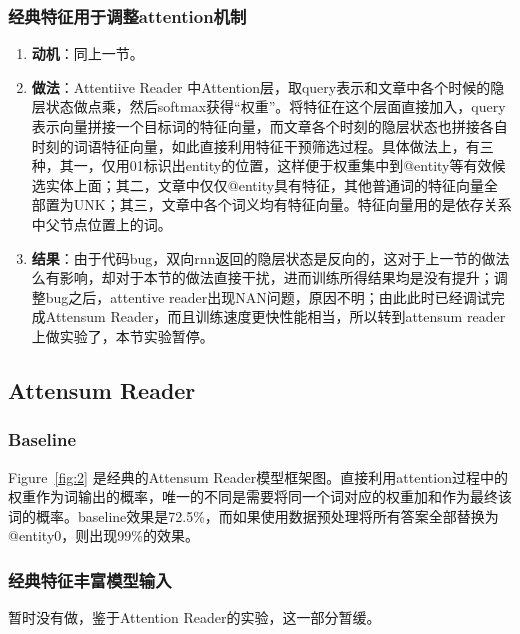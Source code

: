 \documentclass[11pt]{article}
\begin{document}
\subsubsection{经典特征用于调整attention机制}
\begin{enumerate}
    \item  {\bf 动机}：同上一节。
    \item  {\bf 做法}：Attentiive Reader 中Attention层，取query表示和文章中各个时候的隐层状态做点乘，然后softmax获得“权重”。将特征在这个层面直接加入，query表示向量拼接一个目标词的特征向量，而文章各个时刻的隐层状态也拼接各自时刻的词语特征向量，如此直接利用特征干预筛选过程。具体做法上，有三种，其一，仅用01标识出entity的位置，这样便于权重集中到@entity等有效候选实体上面；其二，文章中仅仅@entity具有特征，其他普通词的特征向量全部置为UNK；其三，文章中各个词义均有特征向量。特征向量用的是依存关系中父节点位置上的词。
    \item  {\bf  结果}：由于代码bug，双向rnn返回的隐层状态是反向的，这对于上一节的做法么有影响，却对于本节的做法直接干扰，进而训练所得结果均是没有提升；调整bug之后，attentive reader出现NAN问题，原因不明；由此此时已经调试完成Attensum Reader，而且训练速度更快性能相当，所以转到attensum reader上做实验了，本节实验暂停。
\end{enumerate}

\subsection{Attensum Reader}
\subsubsection{Baseline}
Figure~\ref{fig:2} 是经典的Attensum Reader模型框架图。直接利用attention过程中的权重作为词输出的概率，唯一的不同是需要将同一个词对应的权重加和作为最终该词的概率。baseline效果是72.5\%，而如果使用数据预处理将所有答案全部替换为@entity0，则出现99\%的效果。
\subsubsection{经典特征丰富模型输入}
暂时没有做，鉴于Attention Reader的实验，这一部分暂缓。
\end{document}
